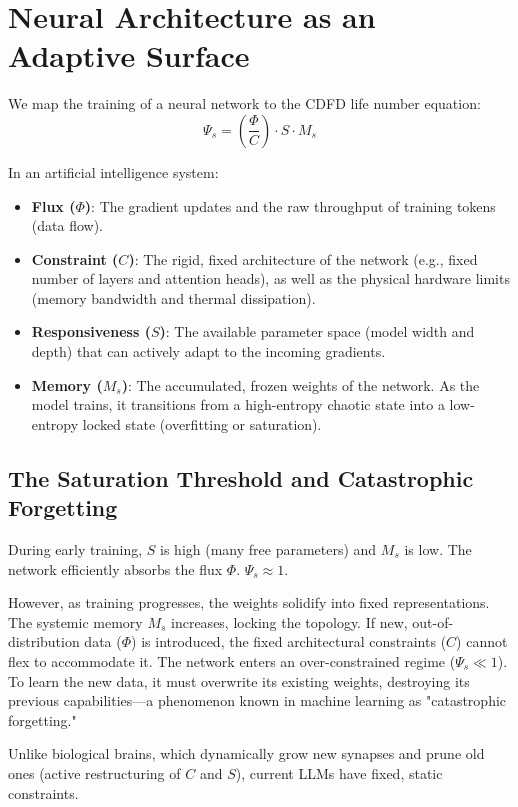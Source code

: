 \documentclass[11pt,a4paper]{article}
\begin{document}
\section{Neural Architecture as an Adaptive Surface}
We map the training of a neural network to the CDFD life number equation:
\begin{equation}
    \Psi_s = \left( \frac{\Phi}{C} \right) \cdot S \cdot M_s
\end{equation}

In an artificial intelligence system:
\begin{itemize}
    \item \textbf{Flux ($\Phi$)}: The gradient updates and the raw throughput of training tokens (data flow).
    \item \textbf{Constraint ($C$)}: The rigid, fixed architecture of the network (e.g., fixed number of layers and attention heads), as well as the physical hardware limits (memory bandwidth and thermal dissipation).
    \item \textbf{Responsiveness ($S$)}: The available parameter space (model width and depth) that can actively adapt to the incoming gradients.
    \item \textbf{Memory ($M_s$)}: The accumulated, frozen weights of the network. As the model trains, it transitions from a high-entropy chaotic state into a low-entropy locked state (overfitting or saturation).
\end{itemize}

\subsection{The Saturation Threshold and Catastrophic Forgetting}
During early training, $S$ is high (many free parameters) and $M_s$ is low. The network efficiently absorbs the flux $\Phi$. $\Psi_s \approx 1$.

However, as training progresses, the weights solidify into fixed representations. The systemic memory $M_s$ increases, locking the topology. If new, out-of-distribution data ($\Phi$) is introduced, the fixed architectural constraints ($C$) cannot flex to accommodate it. The network enters an over-constrained regime ($\Psi_s \ll 1$). To learn the new data, it must overwrite its existing weights, destroying its previous capabilities---a phenomenon known in machine learning as "catastrophic forgetting."

Unlike biological brains, which dynamically grow new synapses and prune old ones (active restructuring of $C$ and $S$), current LLMs have fixed, static constraints.
\end{document}
